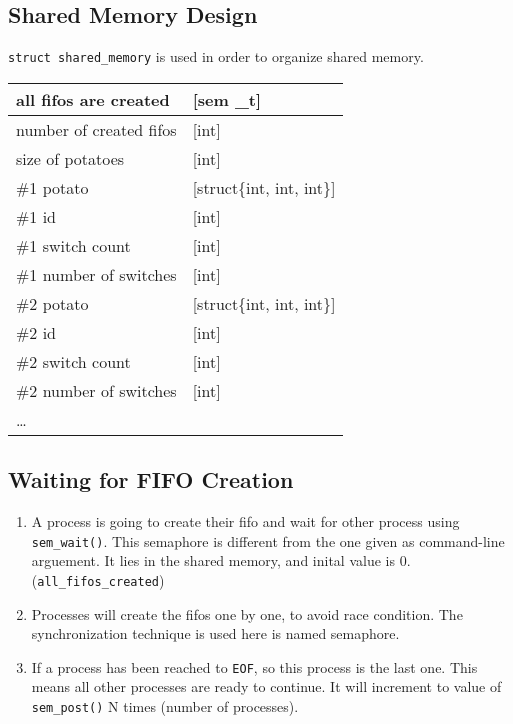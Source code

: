 \documentclass[a4paper]{article}
\begin{document}
\subsection{Shared Memory Design}
\label{sec:orgfd53198}
\texttt{struct shared\_memory} is used in order to organize shared memory.

\begin{center}
\ttfamily{}
\begin{tabular}{l|l}
all fifos are created & [sem \_t]\\
\hline
number of created fifos & [int]\\
\hline
size of potatoes & [int]\\
\hline
\#1 potato & [struct\{int, int, int\}]\\
\quad \#1 id & [int]\\
\quad \#1 switch count & [int]\\
\quad \#1 number of switches & [int]\\
\hline
\#2 potato & [struct\{int, int, int\}]\\
\quad \#2 id & [int]\\
\quad \#2 switch count & [int]\\
\quad \#2 number of switches & [int]\\
\hline
\ldots{} & \\
\end{tabular}
\end{center}

\subsection{Waiting for FIFO Creation}
\label{sec:org64c899a}
\begin{enumerate}
\item A process is going to create their fifo and wait for other process using \texttt{sem\_wait()}. This semaphore is different from the one given as command-line arguement. It lies in the shared memory, and inital value is 0. (\texttt{all\_fifos\_created})
\item Processes will create the fifos one by one, to avoid race condition. The synchronization technique is used here is named semaphore.
\item If a process has been reached to \texttt{EOF}, so this process is the last one. This means all other processes are ready to continue. It will increment to value of \texttt{sem\_post()} N times (number of processes).
\end{enumerate}

\begin{ccode}
\end{ccode}
\end{document}
